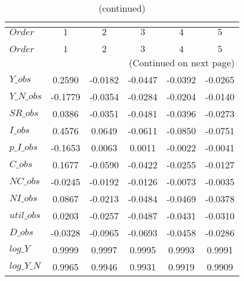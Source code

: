  
\begin{center}
\begin{longtable}{lccccc} 
\caption{COEFFICIENTS OF AUTOCORRELATION}\\
 \label{Table:th_autocorr_matrix}\\
\toprule 
$Order      $	 & 	 $          1$	 & 	 $          2$	 & 	 $          3$	 & 	 $          4$	 & 	 $          5$\\
\midrule \endfirsthead 
\caption{(continued)}\\
 \toprule \\ 
$Order      $	 & 	 $          1$	 & 	 $          2$	 & 	 $          3$	 & 	 $          4$	 & 	 $          5$\\
\midrule \endhead 
\midrule \multicolumn{6}{r}{(Continued on next page)} \\ \bottomrule \endfoot 
\bottomrule \endlastfoot 
$Y\_obs     $	 & 	     0.2590	 & 	    -0.0182	 & 	    -0.0447	 & 	    -0.0392	 & 	    -0.0265 \\ 
$Y\_N\_obs  $	 & 	    -0.1779	 & 	    -0.0354	 & 	    -0.0284	 & 	    -0.0204	 & 	    -0.0140 \\ 
$SR\_obs    $	 & 	     0.0386	 & 	    -0.0351	 & 	    -0.0481	 & 	    -0.0396	 & 	    -0.0273 \\ 
$I\_obs     $	 & 	     0.4576	 & 	     0.0649	 & 	    -0.0611	 & 	    -0.0850	 & 	    -0.0751 \\ 
$p\_I\_obs  $	 & 	    -0.1653	 & 	     0.0063	 & 	     0.0011	 & 	    -0.0022	 & 	    -0.0041 \\ 
$C\_obs     $	 & 	     0.1677	 & 	    -0.0590	 & 	    -0.0422	 & 	    -0.0255	 & 	    -0.0127 \\ 
$NC\_obs    $	 & 	    -0.0245	 & 	    -0.0192	 & 	    -0.0126	 & 	    -0.0073	 & 	    -0.0035 \\ 
$NI\_obs    $	 & 	     0.0867	 & 	    -0.0213	 & 	    -0.0484	 & 	    -0.0469	 & 	    -0.0378 \\ 
$util\_obs  $	 & 	     0.0203	 & 	    -0.0257	 & 	    -0.0487	 & 	    -0.0431	 & 	    -0.0310 \\ 
$D\_obs     $	 & 	    -0.0328	 & 	    -0.0965	 & 	    -0.0693	 & 	    -0.0458	 & 	    -0.0286 \\ 
$log\_Y     $	 & 	     0.9999	 & 	     0.9997	 & 	     0.9995	 & 	     0.9993	 & 	     0.9991 \\ 
$log\_Y\_N  $	 & 	     0.9965	 & 	     0.9946	 & 	     0.9931	 & 	     0.9919	 & 	     0.9909 \\ 

\end{longtable}
\end{center}
